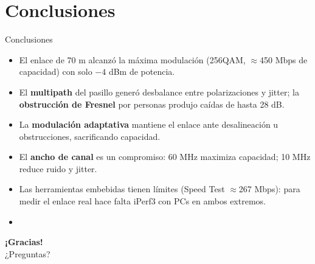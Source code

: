 \renewcommand{\seccorta}{Conclusiones}
\section{Conclusiones}

\begin{frame}{Conclusiones}
  \begin{itemize}
    \item El enlace de 70 m alcanzó la máxima modulación (256QAM, $\approx$450 Mbps de
          capacidad) con solo $-4$ dBm de potencia.
    \item El \textbf{multipath} del pasillo generó desbalance entre polarizaciones y jitter;
          la \textbf{obstrucción de Fresnel} por personas produjo caídas de hasta 28 dB.
    \item La \textbf{modulación adaptativa} mantiene el enlace ante desalineación u
          obstrucciones, sacrificando capacidad.
    \item El \textbf{ancho de canal} es un compromiso: 60 MHz maximiza capacidad; 10 MHz
          reduce ruido y jitter.
    \item Las herramientas embebidas tienen límites (Speed Test $\approx$267 Mbps):
          para medir el enlace real hace falta iPerf3 con PCs en ambos extremos.
    \item {}
  \end{itemize}
\end{frame}

\begin{frame}[plain]
  \centering\vfill
  {\Huge\bfseries ¡Gracias!}\\[8pt]
  {\color{naranja}\large ¿Preguntas?}
  \vfill
\end{frame}

